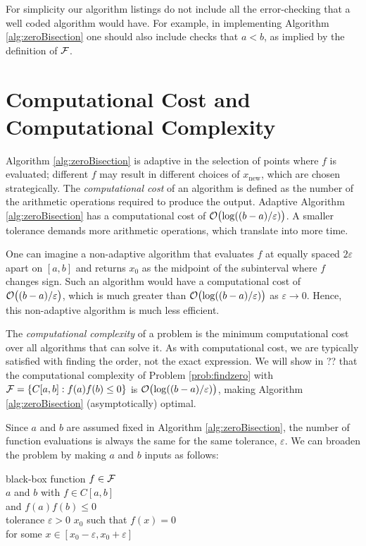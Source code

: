 For simplicity our algorithm listings do not include all the error-checking that a well coded algorithm would have.  For example, in implementing Algorithm \ref{alg:zeroBisection} one should also include checks that $a< b$, as implied by the definition of $\mathcal{F}$.

\section{Computational Cost and Computational Complexity}

Algorithm \ref{alg:zeroBisection} is adaptive in the selection of points where $f$ is evaluated; different $f$ may result in different choices of $x_{\text{new}}$, which are chosen strategically. The \emph{computational cost} of an algorithm is defined as the number of the arithmetic operations required to produce the output.  Adaptive Algorithm \ref{alg:zeroBisection} has a computational cost of $\operatorname{{\mathcal O}}\bigl(\log((b-a)/\varepsilon)\bigr)$.  A smaller tolerance demands more arithmetic operations, which translate into more time.

One can imagine a non-adaptive algorithm that evaluates $f$ at  equally spaced $2\varepsilon$ apart on $[a,b]$ and returns $x_0$ as the midpoint of the subinterval where $f$ changes sign.  Such an algorithm would have a computational cost of $\operatorname{{\mathcal O}}\bigl((b-a)/\varepsilon\bigr)$, which is much greater than $\operatorname{{\mathcal O}}\bigl(\log((b-a)/\varepsilon)\bigr)$ as $\varepsilon \to 0$.  Hence, this non-adaptive algorithm is much less efficient.   

The \emph{computational complexity} of a problem is the minimum computational cost over all algorithms that can solve it.  As with computational cost, we are typically satisfied with finding the order, not the exact expression.  We will show in ?? that the computational complexity of Problem \ref{prob:findzero} with $\mathcal{F} = \{C[a,b] : f(a)f(b) \le 0\}$ is $\operatorname{{\mathcal O}}\bigl(\log((b-a)/\varepsilon)\bigr)$, making Algorithm \ref{alg:zeroBisection} (asymptotically) optimal.

Since $a$ and $b$ are assumed fixed in Algorithm \ref{alg:zeroBisection}, the number of function evaluations is always the same for the same tolerance, $\varepsilon$.  We can broaden the problem by making $a$ and $b$ inputs as follows:

\begin{NumProblem}%
\label{prob:findzerocont}
%
{black-box function $f \in \mathcal{F}$ \\ 
$a$ and $b$ with $f \in C[a,b]$ \\
\qquad and $f(a) f(b) \le 0$ \\
tolerance $\varepsilon > 0$ }%
{$x_0$ such that $f(x) = 0$ \\ 
    \qquad for some $x \in [x_0 - \varepsilon, x_0 + \varepsilon]$}
\end{NumProblem}

